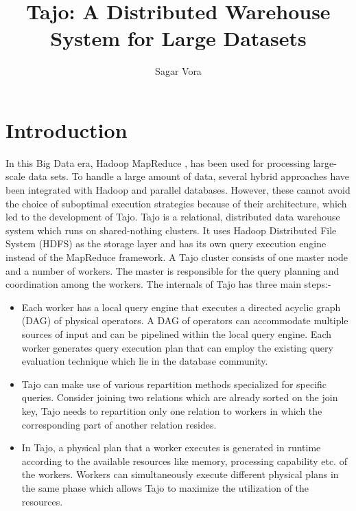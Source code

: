 \documentclass[9pt,twocolumn,twoside]{../../styles/osajnl}
\title{Tajo: A Distributed Warehouse System for Large Datasets}
\author[1]{Sagar Vora}
\affil[1]{School of Informatics and Computing, Bloomington, IN 47408, U.S.A.}
\begin{document}
\maketitle

\section{Introduction}
In this Big Data era, Hadoop MapReduce
\cite{www-apache-hadoop}\cite{mapreduce-article}, has been used for
processing large-scale data sets. To handle a large amount of data,
several hybrid approaches have been integrated with Hadoop and
parallel databases. However, these cannot avoid the choice of
suboptimal execution strategies because of their architecture, which
led to the development of Tajo. Tajo \cite{www-apache-tajo} is a
relational, distributed data warehouse system which runs on
shared-nothing clusters. It uses Hadoop Distributed File System (HDFS)
as the storage layer and has its own query execution engine instead of
the MapReduce framework. A Tajo cluster consists of one master node
and a number of workers. The master is responsible for the query
planning and coordination among the workers. \newline \newline The
internals of Tajo has three main steps:- \begin{itemize} \item Each
  worker has a local query engine that executes a directed acyclic
  graph (DAG) of physical operators. A DAG of operators can
  accommodate multiple sources of input and can be pipelined within
  the local query engine. Each worker generates query execution plan
  that can employ the existing query evaluation technique
  \cite{query-evaluation-article} \cite{query-processing-article}
  which lie in the database community. \item Tajo can make use of
  various repartition methods specialized for specific
  queries. Consider joining two relations which are already sorted on
  the join key, Tajo needs to repartition only one relation to workers
  in which the corresponding part of another relation resides. \item
  In Tajo, a physical plan that a worker executes is generated in
  runtime according to the available resources like memory, processing
  capability etc. of the workers. Workers can simultaneously execute
  different physical plans in the same phase which allows Tajo to
  maximize the utilization of the resources. \end{itemize}
\end{document}
